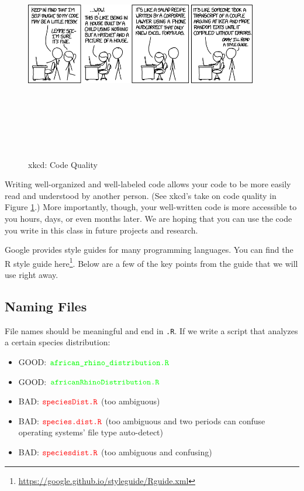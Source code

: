 \documentclass[]{krantz}
\providecommand{\tightlist}{%
  \setlength{\itemsep}{0pt}\setlength{\parskip}{0pt}}
\renewcommand{\href}[2]{#2\footnote{\url{#1}}}
\theoremstyle{definition}
\theoremstyle{definition}
\theoremstyle{definition}
\theoremstyle{remark}
\begin{document}
\begin{figure}
\includegraphics[width=4in,height=4in]{02-introToR/02-images/code_quality} \caption{xkcd: Code Quality}\label{fig:comic}
\end{figure}

Writing well-organized and well-labeled code allows your code to be more
easily read and understood by another person. (See xkcd's take on code
quality in Figure \ref{fig:comic}.) More importantly, though, your
well-written code is more accessible to you hours, days, or even months
later. We are hoping that you can use the code you write in this class
in future projects and research.

Google provides style guides for many programming languages. You can
find the R style guide
\href{https://google.github.io/styleguide/Rguide.xml}{here}. Below are a
few of the key points from the guide that we will use right away.

\subsection{Naming Files}\label{naming-files}

File names should be meaningful and end in \texttt{.R}. If we write a
script that analyzes a certain species distribution:

\begin{itemize}
\tightlist
\item
  GOOD: \(\color{green}{\verb+african_rhino_distribution.R+}\)
\item
  GOOD: \(\color{green}{\verb+africanRhinoDistribution.R+}\)
\item
  BAD: \(\color{red}{\verb+speciesDist.R+}\) (too ambiguous)
\item
  BAD: \(\color{red}{\verb+species.dist.R+}\) (too ambiguous and two
  periods can confuse operating systems' file type auto-detect)
\item
  BAD: \(\color{red}{\verb+speciesdist.R+}\) (too ambiguous and
  confusing)
\end{itemize}
\end{document}
